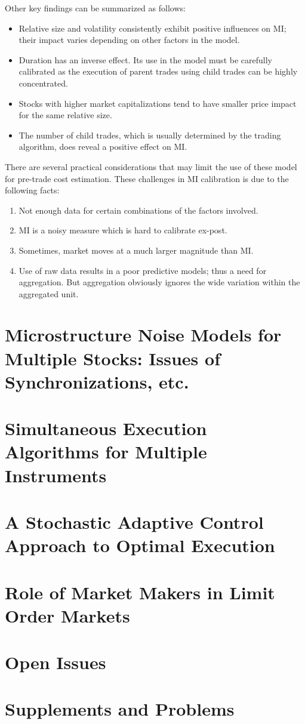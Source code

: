 Other key findings can be summarized as follows:

\begin{itemize}
\item Relative size and volatility consistently exhibit positive influences on MI; their impact varies depending on other factors in the model.

\item Duration has an inverse effect. Its use in the model must be carefully calibrated as the execution of parent trades using child trades can be highly concentrated.

\item Stocks with higher market capitalizations tend to have smaller price impact for the same relative size.

\item The number of child trades, which is usually determined by the trading algorithm, does reveal a positive effect on MI.
\end{itemize}

There are several practical considerations that may limit the use of these model for pre-trade cost estimation. These challenges in MI calibration is due to the following facts:
	\begin{enumerate}[--]
	\item Not enough data for certain combinations of the factors involved.
	
	\item MI is a noisy measure which is hard to calibrate ex-post.
	
	\item Sometimes, market moves at a much larger magnitude than MI.
	
	\item Use of raw data results in a poor predictive models; thus a need for aggregation. But aggregation obviously ignores the wide variation within the aggregated unit. 
	\end{enumerate}

\section{Microstructure Noise Models for Multiple Stocks:  Issues of Synchronizations, etc.}
\section{Simultaneous Execution Algorithms for Multiple Instruments}
\section{A Stochastic Adaptive Control Approach to Optimal Execution}
\section{Role of Market Makers in Limit Order Markets}
\section{Open Issues}
\section{Supplements and Problems} 	